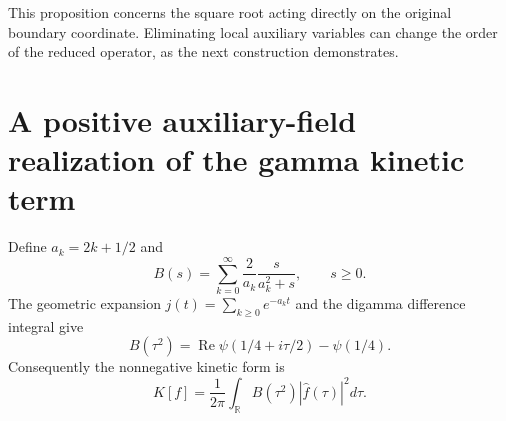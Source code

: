 \documentclass[11pt]{article}
\numberwithin{equation}{section}
\theoremstyle{definition}
\theoremstyle{remark}
\newcommand{\R}{\mathbb R}
\DeclareMathOperator{\Rea}{Re}
\begin{document}
This proposition concerns the square root acting directly on the original
boundary coordinate. Eliminating local auxiliary variables can change the
order of the reduced operator, as the next construction demonstrates.

\section{A positive auxiliary-field realization of the gamma kinetic term}
\label{sec:tower}

Define $a_k=2k+1/2$ and
\begin{equation}
B(s)=\sum_{k=0}^\infty\frac2{a_k}\frac{s}{a_k^2+s},\qquad s\geq0.
\label{eq:B}
\end{equation}
The geometric expansion $j(t)=\sum_{k\geq0}e^{-a_kt}$ and the digamma
difference integral give
\begin{equation}
B(\tau^2)=\Rea\psi(1/4+i\tau/2)-\psi(1/4).
\label{eq:Bdigamma}
\end{equation}
Consequently the nonnegative kinetic form is
\begin{equation}
K[f]=\frac1{2\pi}\int_\R B(\tau^2)|\widehat f(\tau)|^2d\tau.
\end{equation}
\end{document}
